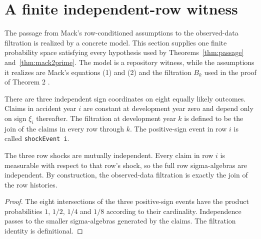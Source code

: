 \chapter{A finite independent-row witness}

The passage from Mack's row-conditioned assumptions to the observed-data filtration is realized
by a concrete model. This section supplies one finite probability space satisfying every hypothesis
used by Theorems~\ref{thm:passage} and~\ref{thm:mack2prime}. The model is a repository witness, while
the assumptions it realizes are Mack's equations (1) and (2) and the filtration $B_k$ used in the
proof of Theorem 2 \cite{Mack1993}.

\begin{definition}\label{def:independenceWitness}\leanok
{}
There are three independent sign coordinates on eight equally likely outcomes. Claims in accident
year $i$ are constant at development year zero and depend only on sign $\xi_i$ thereafter. The
filtration at development year $k$ is defined to be the join of the claims in every row through
$k$. The positive-sign event in row $i$ is called \texttt{shockEvent i}.
\end{definition}

\begin{theorem}\label{thm:independenceWitnessRows}\leanok
{}
The three row shocks are mutually independent. Every claim in row $i$ is measurable with respect
to that row's shock, so the full row sigma-algebras are independent. By construction, the
observed-data filtration is exactly the join of the row histories.
\end{theorem}
\begin{proof}\leanok The eight intersections of the three positive-sign events have the product
probabilities $1$, $1/2$, $1/4$ and $1/8$ according to their cardinality. Independence passes to
the smaller sigma-algebras generated by the claims. The filtration identity is definitional.
\end{proof}

